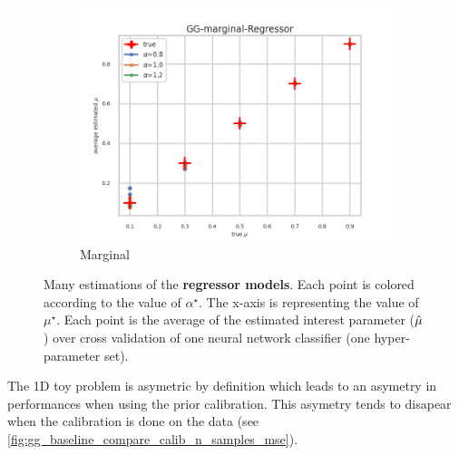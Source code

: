 \begin{figure}[ht!]
  \begin{subfigure}[t]{0.49\linewidth}
    \includegraphics[width=\linewidth]{COMPARE/GG-Marginal/Regressor/profusion_true_mu_target_mean.png}
    \caption{Marginal}
  \end{subfigure}%

  \caption{Many estimations of the \textbf{regressor models}. Each point is colored according to the value of $\alpha^\star$. The x-axis is representing the value of $\mu^\star$. Each point is the average of the estimated interest parameter ($\hat\mu$) over cross validation of one neural network classifier (one hyper-parameter set).}
  \label{fig:gg_regressor_compare_calib_estimator}
\end{figure}



The 1D toy problem is asymetric by definition which leads to an asymetry in performances when using the prior calibration.
This asymetry tends to disapear when the calibration is done on the data (see \autoref{fig:gg_baseline_compare_calib_n_samples_mse}).


